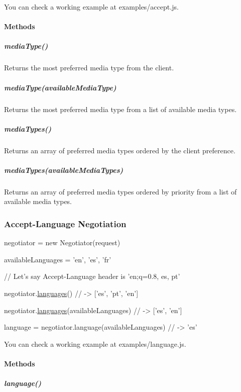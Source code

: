 You can check a working example at {\ttfamily examples/accept.\+js}.

\paragraph*{Methods}

\subparagraph*{media\+Type()}

Returns the most preferred media type from the client.

\subparagraph*{media\+Type(available\+Media\+Type)}

Returns the most preferred media type from a list of available media types.

\subparagraph*{media\+Types()}

Returns an array of preferred media types ordered by the client preference.

\subparagraph*{media\+Types(available\+Media\+Types)}

Returns an array of preferred media types ordered by priority from a list of available media types.

\subsubsection*{Accept-\/\+Language Negotiation}


\begin{DoxyCode}
negotiator = \textcolor{keyword}{new} Negotiator(request)

availableLanguages = 'en', 'es', 'fr'

\textcolor{comment}{// Let's say Accept-Language header is 'en;q=0.8, es, pt'}

negotiator.\hyperlink{namespacelanguages}{languages}()
\textcolor{comment}{// -> ['es', 'pt', 'en']}

negotiator.\hyperlink{namespacelanguages}{languages}(availableLanguages)
\textcolor{comment}{// -> ['es', 'en']}

language = negotiator.language(availableLanguages)
\textcolor{comment}{// -> 'es'}
\end{DoxyCode}


You can check a working example at {\ttfamily examples/language.\+js}.

\paragraph*{Methods}

\subparagraph*{language()}

